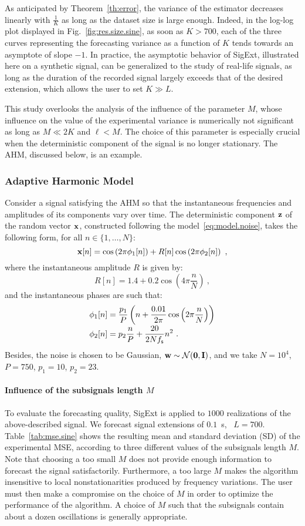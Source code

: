 As anticipated by Theorem~\ref{th:error}, the variance of the estimator decreases linearly with $\frac1K$ as long as the dataset size is large enough. Indeed, in the log-log plot displayed in Fig.~\ref{fig:res.size.sine}, as soon as $K>700$, each of the three curves representing the forecasting variance as a function of $K$ tends towards an asymptote of slope $-1$. 
%
In practice, the asymptotic behavior of {\sf SigExt}, illustrated here on a synthetic signal, can be generalized to the study of real-life signals, as long as the duration of the recorded signal largely exceeds that of the desired extension, which allows the user to set $K\gg L$.


This study overlooks the analysis of the influence of the parameter $M$, whose influence on the value of the experimental variance is numerically not significant as long as $M\ll 2K$ and $\ell<M$. The choice of this parameter is especially crucial when the deterministic component of the signal is no longer stationary. The AHM, discussed below, is an example.

\subsubsection{Adaptive Harmonic Model}
\label{ssse:res.ahm}
Consider a signal satisfying the AHM so that the instantaneous frequencies and amplitudes of its components vary over time. The deterministic component ${\mathbf z}$ of the random vector ${\mathbf x}$, constructed following the model~\eqref{eq:model.noise}, takes the following form, for all $n\in\{1,\ldots,N\}$:
\[
{\mathbf x}[n] = \cos\left(2\pi \phi_1[n] \right) + R[n]\cos\left(2\pi \phi_2[n] \right) \ ,
\] 
where the instantaneous amplitude $R$ is given by:
\[
R[n] = 1.4 + 0.2\cos\left(4\pi\frac{n}{N}\right)\ ,
\]
and the instantaneous phases are such that:
\begin{align*}
\phi_1[n] &= \frac{p_1}{P}\left( n + \frac{0.01}{2\pi}\cos\left(2\pi\frac{n}{N}\right) \right) \\[-1mm]
\phi_2[n] & = p_2\frac{n}{P} + \frac{20}{2Nf_{\mathsf s}}n^2\ .
\end{align*}
Besides, the noise is chosen to be Gaussian, ${\mathbf w}\sim{\mathcal N}(\boldsymbol{0},{\mathbf I})$, and we take $N=10^4$, $P=750$, $p_1=10$, $p_2=23$.

\paragraph{Influence of the subsignals length $M$}
To evaluate the forecasting quality, {\sf SigExt} is applied to $1000$ realizations of the above-described signal. We forecast signal extensions of $0.1$~s, \ie~$L=700$. Table~\ref{tab:mse.sine} shows the resulting mean and standard deviation (SD) of the experimental MSE, according to three different values of the subsignals length $M$. Note that choosing a too small $M$ does not provide enough information to forecast the signal satisfactorily. Furthermore, a too large $M$ makes the algorithm insensitive to local nonstationarities produced by frequency variations. The user must then make a compromise on the choice of $M$ in order to optimize the performance of the algorithm. A choice of $M$ such that the subsignals contain about a dozen oscillations is generally appropriate.


